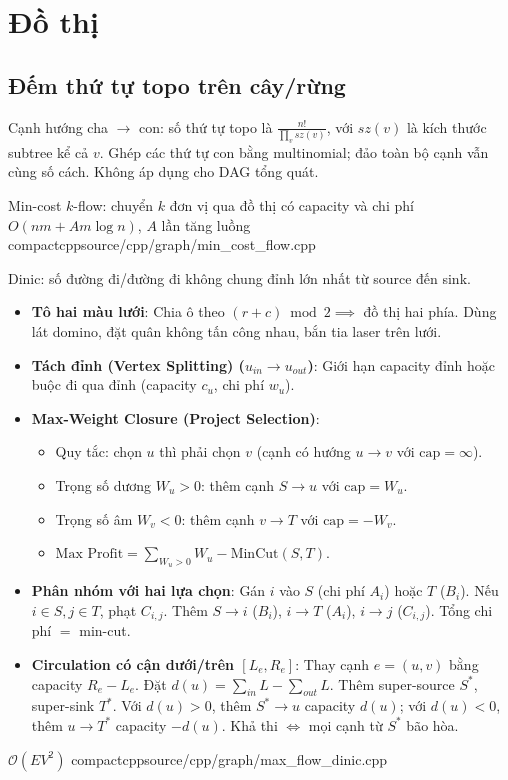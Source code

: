 \section{Đồ thị}



\subsection{Đếm thứ tự topo trên cây/rừng}
Cạnh hướng cha $\to$ con: số thứ tự topo là $\displaystyle \frac{n!}{\prod_v sz(v)}$, với $sz(v)$ là kích thước subtree kể cả $v$. Ghép các thứ tự con bằng multinomial; đảo toàn bộ cạnh vẫn cùng số cách. Không áp dụng cho DAG tổng quát.


{Min-cost $k$-flow: chuyển $k$ đơn vị qua đồ thị có capacity và chi phí}
{$O(nm + A m\log n)$, $A$ lần tăng luồng}
{compactcpp}{source/cpp/graph/min_cost_flow.cpp}

{Dinic: số đường đi/đường đi không chung đỉnh lớn nhất từ source đến sink.
\begin{itemize}
    \item \textbf{Tô hai màu lưới}: Chia ô theo $(r + c) \bmod 2 \implies$ đồ thị hai phía. Dùng lát domino, đặt quân không tấn công nhau, bắn tia laser trên lưới.
    \item \textbf{Tách đỉnh (Vertex Splitting) ($u_{in} \to u_{out}$)}: Giới hạn capacity đỉnh hoặc buộc đi qua đỉnh (capacity $c_u$, chi phí $w_u$).
    \item \textbf{Max-Weight Closure (Project Selection)}:
    \begin{itemize}
        \item Quy tắc: chọn $u$ thì phải chọn $v$ (cạnh có hướng $u \to v$ với $\text{cap} = \infty$).
        \item Trọng số dương $W_u > 0$: thêm cạnh $S \to u$ với $\text{cap} = W_u$.
        \item Trọng số âm $W_v < 0$: thêm cạnh $v \to T$ với $\text{cap} = -W_v$.
        \item $\text{Max Profit} = \sum_{W_u > 0} W_u - \text{MinCut}(S, T)$.
    \end{itemize}
    \item \textbf{Phân nhóm với hai lựa chọn}: Gán $i$ vào $S$ (chi phí $A_i$) hoặc $T$ ($B_i$). Nếu $i \in S, j \in T$, phạt $C_{i,j}$. Thêm $S \to i$ ($B_i$), $i \to T$ ($A_i$), $i \to j$ ($C_{i,j}$). Tổng chi phí $=$ min-cut.
    \item \textbf{Circulation có cận dưới/trên $[L_e, R_e]$}: Thay cạnh $e=(u,v)$ bằng capacity $R_e-L_e$. Đặt $d(u)=\sum_{in}L-\sum_{out}L$. Thêm super-source $S^*$, super-sink $T^*$. Với $d(u)>0$, thêm $S^*\to u$ capacity $d(u)$; với $d(u)<0$, thêm $u\to T^*$ capacity $-d(u)$. Khả thi $\iff$ mọi cạnh từ $S^*$ bão hòa.
\end{itemize}
}
{$\mathcal{O}(EV^2)$}
{compactcpp}{source/cpp/graph/max_flow_dinic.cpp}


